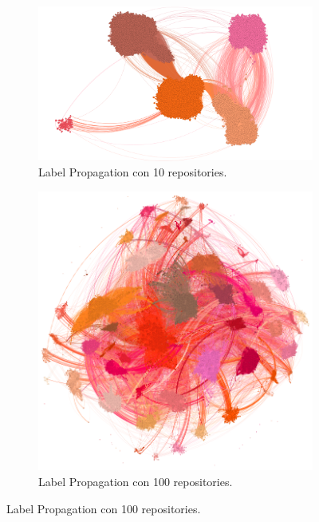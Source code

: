 \documentclass[11pt]{article}
\begin{document}
\begin{itemize}
\begin{figure}[!ht]
    \centering
    \begin{subfigure}{.5\textwidth}
        \centering
        \includegraphics[width=\linewidth]{./images/OpenOrdLabelProp_10.png}
        \caption{Label Propagation con 10 repositories.}
        \label{fig:LabelPropagation10}
    \end{subfigure}%
    \begin{subfigure}{.5\textwidth}
        \centering
        \includegraphics[width=\linewidth]{./images/OpenOrdLabelProp_100.png}
        \caption{Label Propagation con 100 repositories.}
        \label{fig:LabelPropagation100}

\end{subfigure}
\end{figure}
\end{itemize}
\end{document}
